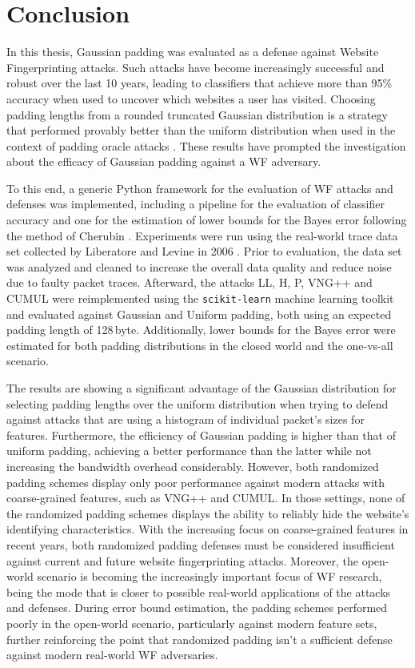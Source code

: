 \documentclass[
	ruledheaders=chapter,
	class=report,
	thesis={type=master, department=inf},
	accentcolor=1c,
	custommargins=true,
	marginpar=false,
	parskip=half-,
	fontsize=11pt,
]{tudapub}
\begin{document}
	\chapter{Conclusion}
	\label{conclusion}
	
	In this thesis, Gaussian padding was evaluated as a defense against Website Fingerprinting attacks. Such attacks have become increasingly successful and robust over the last 10 years, leading to classifiers that achieve more than 95\% accuracy when used to uncover which websites a user has visited. Choosing padding lengths from a rounded truncated Gaussian distribution is a strategy that performed provably better than the uniform distribution when used in the context of padding oracle attacks \cite{Degabriele2021}. These results have prompted the investigation about the efficacy of Gaussian padding against a WF adversary. 
	
	To this end, a generic Python framework for the evaluation of WF attacks and defenses was implemented, including a pipeline for the evaluation of classifier accuracy and one for the estimation of lower bounds for the Bayes error following the method of Cherubin \cite{Cherubin2017}. Experiments were run using the real-world trace data set collected by Liberatore and Levine in 2006 \cite{Liberatore2006}. Prior to evaluation, the data set was analyzed and cleaned to increase the overall data quality and reduce noise due to faulty packet traces. Afterward, the attacks LL, H, P, VNG++ and CUMUL were reimplemented using the \texttt{scikit-learn} machine learning toolkit and evaluated against Gaussian and Uniform padding, both using an expected padding length of 128$\,$byte. Additionally, lower bounds for the Bayes error were estimated for both padding distributions in the closed world and the one-vs-all scenario.
	
	The results are showing a significant advantage of the Gaussian distribution for selecting padding lengths over the uniform distribution when trying to defend against attacks that are using a histogram of individual packet's sizes for features. Furthermore, the efficiency of Gaussian padding is higher than that of uniform padding, achieving a better performance than the latter while not increasing the bandwidth overhead considerably. However, both randomized padding schemes display only poor performance against modern attacks with coarse-grained features, such as VNG++ and CUMUL. In those settings, none of the randomized padding schemes displays the ability to reliably hide the website's identifying characteristics. With the increasing focus on coarse-grained features in recent years, both randomized padding defenses must be considered insufficient against current and future website fingerprinting attacks. Moreover, the open-world scenario is becoming the increasingly important focus of WF research, being the mode that is closer to possible real-world applications of the attacks and defenses. During error bound estimation, the padding schemes performed poorly in the open-world scenario, particularly against modern feature sets, further reinforcing the point that randomized padding isn't a sufficient defense against modern real-world WF adversaries.
	
\end{document}
